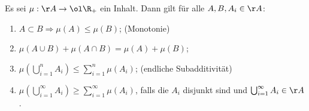 \begin{prob}\label{ueb:Inhalt}
Es sei $\mu:\AA\to\ol\R_+$ ein Inhalt. Dann gilt f\"ur alle $A, B, A_i \in \AA$:
\begin{enumerate}[label = (\alph*)]
	\item $A\subset B \Longrightarrow \mu(A)\leq\mu(B)$; (Monotonie)
	\item $\mu(A\cup B)+\mu(A\cap B)=\mu(A)+\mu(B)$;
	\item $\mu(\bigcup_{i=1}^nA_i)\leq\sum_{i=1}^n\mu(A_i)$; (endliche Subadditivität)
	\item $\mu(\bigcup_{i=1}^\infty A_i)\geq\sum_{i=1}^\infty\mu(A_i)$,
	falls die $A_i$ disjunkt sind und $\bigcup_{i=1}^\infty A_i\in\AA$.
\end{enumerate}
\end{prob}
